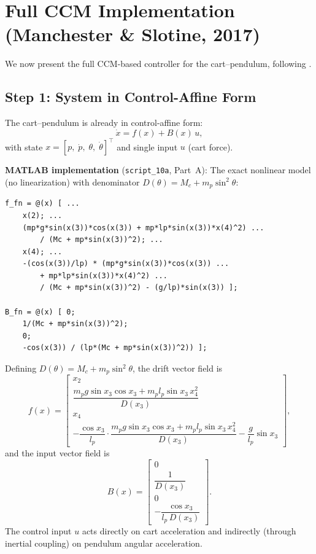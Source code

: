 \documentclass[11pt,a4paper]{article}
\begin{document}
\section{Full CCM Implementation (Manchester \& Slotine, 2017)}

We now present the full CCM-based controller for the cart--pendulum, following \cite{manchester2017ccm}.

\subsection{Step 1: System in Control-Affine Form}

The cart--pendulum is already in control-affine form:
\[
\dot x = f(x) + B(x)\,u,
\]
with state \(x = [p,\; \dot p,\; \theta,\; \dot\theta]^\top\) and single input \(u\) (cart force).

\noindent\textbf{MATLAB implementation} (\texttt{script\_10a}, Part~A): The exact nonlinear model (no linearization) with denominator \(D(\theta) = M_c + m_p\sin^2\theta\):

\begin{lstlisting}
f_fn = @(x) [ ...
    x(2); ...
    (mp*g*sin(x(3))*cos(x(3)) + mp*lp*sin(x(3))*x(4)^2) ...
        / (Mc + mp*sin(x(3))^2); ...
    x(4); ...
    -(cos(x(3))/lp) * (mp*g*sin(x(3))*cos(x(3)) ...
        + mp*lp*sin(x(3))*x(4)^2) ...
        / (Mc + mp*sin(x(3))^2) - (g/lp)*sin(x(3)) ];

B_fn = @(x) [ 0;
    1/(Mc + mp*sin(x(3))^2);
    0;
    -cos(x(3)) / (lp*(Mc + mp*sin(x(3))^2)) ];
\end{lstlisting}

\begin{codemath}
Defining \(D(\theta) = M_c + m_p\sin^2\theta\), the drift vector field is
\[
f(x)=
\begin{bmatrix}
x_2 \\[1ex]
\dfrac{m_p g \sin x_3 \cos x_3 + m_p l_p \sin x_3\, x_4^2}{D(x_3)} \\[3ex]
x_4 \\[1ex]
-\dfrac{\cos x_3}{l_p}
\cdot
\dfrac{m_p g \sin x_3 \cos x_3 + m_p l_p \sin x_3\, x_4^2}{D(x_3)}
-\dfrac{g}{l_p}\sin x_3
\end{bmatrix},
\]
and the input vector field is
\[
B(x)=
\begin{bmatrix}
0 \\[1ex]
\dfrac{1}{D(x_3)} \\[3ex]
0 \\[1ex]
-\dfrac{\cos x_3}{l_p\,D(x_3)}
\end{bmatrix}.
\]
The control input \(u\) acts directly on cart acceleration and indirectly (through inertial coupling) on pendulum angular acceleration.
\end{codemath}
\end{document}
